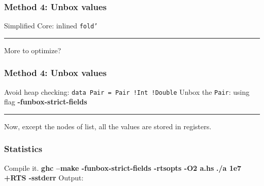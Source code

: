 \documentclass{beamer}
\newcommand{\inlinehaskell}[1]{\texttt{#1}}
\newcommand{\inlineshell}[1]{\textcolor{shellcolor}{\textbf{#1}}}
\begin{document}

\begin{frame}
\frametitle{Method 4: Unbox values}
Simplified Core: inlined \inlinehaskell{fold'}
\newline
{}
\par\noindent\rule{0.8\textwidth}{1.0pt}
\newline\newline
More to optimize?
\end{frame}



\begin{frame}
\frametitle{Method 4: Unbox values}
Avoid heap checking:
\inlinehaskell{data Pair = Pair !Int !Double}\newline
Unbox the \inlinehaskell{Pair}:
using flag \inlineshell{-funbox-strict-fields}
\newline
{}
\par\noindent\rule{0.9\textwidth}{1.0pt}
\newline\newline
Now, except the nodes of list, all the values are stored in registers.
\end{frame}


\begin{frame}
\frametitle{Statistics}
Compile it.\newline
\inlineshell{ghc --make -funbox-strict-fields -rtsopts -O2 a.hs}\newline
\inlineshell{./a 1e7 +RTS -sstderr}\newline\newline
Output:\newline
{}
\end{frame}

\end{document}
